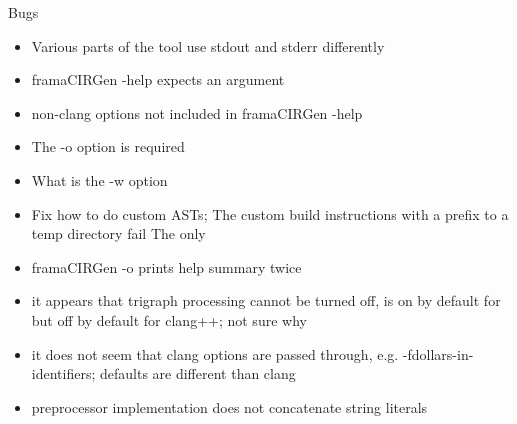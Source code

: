 \documentclass[web]{frama-c-book}
\begin{document}
Bugs
\begin{itemize}
\item Various parts of the tool use stdout and stderr differently
\item framaCIRGen -help expects an argument
\item non-clang options not included in framaCIRGen -help
\item The -o option is required
\item What is the -w option
\item Fix how to do custom ASTs; The custom build instructions with a prefix to a temp directory fail
The only 
\item framaCIRGen -o prints help summary twice
\item it appears that trigraph processing cannot be turned off, is on by default for \irg but off by default for clang++; not sure why
\item it does not seem that clang options are passed through, e.g. -fdollars-in-identifiers; \irg defaults are different than clang
\item preprocessor implementation does not concatenate string literals
\end{itemize}


\cleardoublepage
{}






\cleardoublepage
{}
\printindex
\end{document}
